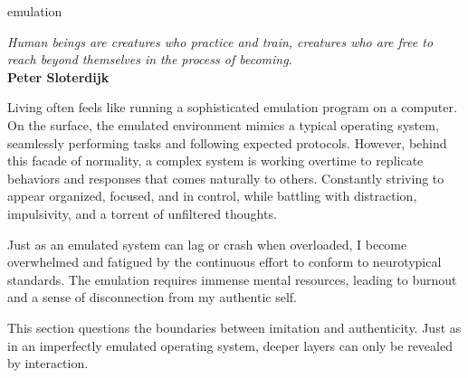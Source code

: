 \begin{center}
\Huge emulation
\vspace{2cm}
\begin{flushright}
\large
\textit{ Human beings are creatures who practice and train, creatures who are free to reach beyond themselves in the process of becoming.}\\
\textbf{ Peter Sloterdijk } 
\citep{sloterdijk2014}
\end{flushright}
\vspace{2cm}
\end{center}
\normalsize

Living often feels like running a sophisticated emulation program on a computer. On the surface, the emulated environment mimics a typical operating system, seamlessly performing tasks and following expected protocols. However, behind this facade of normality, a complex system is working overtime to replicate behaviors and responses that comes naturally to others. Constantly striving to appear organized, focused, and in control, while battling with distraction, impulsivity, and a torrent of unfiltered thoughts.

Just as an emulated system can lag or crash when overloaded, I become overwhelmed and fatigued by the continuous effort to conform to neurotypical standards. The emulation requires immense mental resources, leading to burnout and a sense of disconnection from my authentic self.

This section questions the boundaries between imitation and authenticity. Just as in an imperfectly emulated operating system, deeper layers can only be revealed by interaction.

